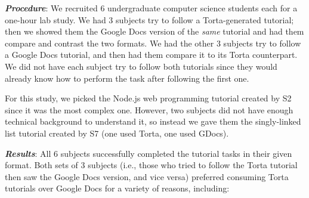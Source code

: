 \emph{\textbf{Procedure}}: We recruited 6 undergraduate computer science
students each for a one-hour lab study. We had 3 subjects try to follow
a Torta-generated tutorial; then we showed them the Google Docs version
of the \emph{same} tutorial and had them compare and contrast the two
formats. We had the other 3 subjects try to follow a Google Docs
tutorial, and then had them compare it to its Torta counterpart. We did
not have each subject try to follow both tutorials since they would already
know how to perform the task after following the first one.

For this study, we picked the Node.js web programming tutorial created by
S2 since it was the most complex one. However, two subjects did
not have enough technical background to understand it, so instead we
gave them the singly-linked list tutorial created by S7 (one used
Torta, one used GDocs).


\emph{\textbf{Results}}: All 6 subjects successfully completed the
tutorial tasks in their given format. Both sets of 3 subjects (i.e.,
those who tried to follow the Torta tutorial then saw the Google Docs
version, and vice versa) preferred consuming Torta tutorials over Google
Docs for a variety of reasons, including:



